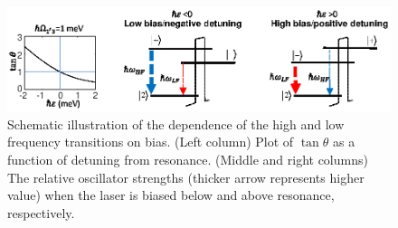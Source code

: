 \documentclass[twocolumn,secnumarabic,amssymb, nobibnotes, aps, prd]{revtex4-1}
\begin{document}
  \label{sec:biasdependence}
 \begin{figure}[h!]
 	\begin{center}
 		\includegraphics[scale=0.75]{BIASDETUNING.eps}
 		\caption{ Schematic illustration of the dependence of the high and low frequency transitions on bias. (Left column) Plot of $\tan\theta$ as a function of detuning from resonance. (Middle and right columns) The relative oscillator strengths (thicker arrow represents higher value) when the laser is biased below and above resonance, respectively. } \label{fig:detuning}
 	\end{center}	
 \end{figure}
\end{document}
